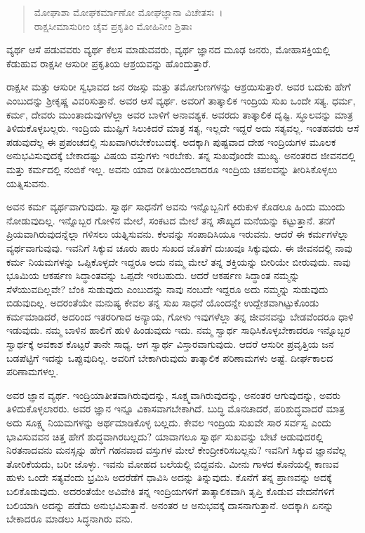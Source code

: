 \begin{verse}
ಮೋಘಾಶಾ ಮೋಘಕರ್ಮಾಣೋ ಮೋಘಜ್ಞಾನಾ ವಿಚೇತಸಃ~।\\ರಾಕ್ಷಸೀಮಾಸುರೀಂ ಚೈವ ಪ್ರಕೃತಿಂ ಮೋಹಿನೀಂ ಶ್ರಿತಾಃ 
\end{verse}

{\small ವ್ಯರ್ಥ ಆಸೆ ಪಡುವವರು ವ್ಯರ್ಥ ಕೆಲಸ ಮಾಡುವವರು, ವ್ಯರ್ಥ ಜ್ಞಾನದ ಮೂಢ ಜನರು, ಮೋಹಾಸಕ್ತಿಯಲ್ಲಿ ಕೆಡುಹುವ ರಾಕ್ಷಸೀ ಆಸುರೀ ಪ್ರಕೃತಿಯ ಆಶ್ರಯವನ್ನು ಹೊಂದುತ್ತಾರೆ.}

ರಾಕ್ಷಸೀ ಮತ್ತು ಆಸುರೀ ಸ್ವಭಾವದ ಜನ ರಜಸ್ಸು ಮತ್ತು ತಮೋಗುಣಗಳನ್ನು ಆಶ್ರಯಿಸುತ್ತಾರೆ. ಅವರ ಬದುಕು ಹೇಗೆ ಎಂಬುದನ್ನು ಶ‍್ರೀಕೃಷ್ಣ ವಿವರಿಸುತ್ತಾನೆ. ಅವರ ಆಸೆ ವ್ಯರ್ಥ. ಅವರಿಗೆ ತಾತ್ಕಾಲಿಕ ಇಂದ್ರಿಯ ಸುಖ ಒಂದೇ ಸತ್ಯ. ಧರ್ಮ, ಕರ್ಮ, ದೇವರು ಮುಂತಾದುವುಗಳೆಲ್ಲಾ ಅವರ ಬಾಳಿಗೆ ಅನಾವಶ್ಯಕ. ಅವರದು ತಾತ್ಕಾಲಿಕ ದೃಷ್ಟಿ. ಸ್ಥೂಲವನ್ನು ಮಾತ್ರ ತಿಳಿದುಕೊಳ್ಳಬಲ್ಲರು. ಇಂದ್ರಿಯ ಮುಷ್ಟಿಗೆ ಸಿಲುಕಿದರೆ ಮಾತ್ರ ಸತ್ಯ, ಇಲ್ಲದೇ ಇದ್ದರೆ ಅದು ಸತ್ಯವಲ್ಲ. ಇಂತಹವರು ಆಸೆ ಪಡುವುದೆಲ್ಲ ಈ ಪ್ರಪಂಚದಲ್ಲಿ ಸುಖವಾಗಿರಬೇಕೆಂಬುದಕ್ಕೆ. ಅದಕ್ಕಾಗಿ ಪುಷ್ಟವಾದ ದೇಹ ಇಂದ್ರಿಯಗಳ ಮೂಲಕ ಅನುಭವಿಸುವುದಕ್ಕೆ ಬೇಕಾದಷ್ಟು ವಿಷಯ ವಸ್ತುಗಳು ಇರಬೇಕು. ತನ್ನ ಸುಖವೊಂದೇ ಮುಖ್ಯ. ಅನಂತರದ ಜೀವನದಲ್ಲಿ ಮತ್ತು ಕರ್ಮದಲ್ಲಿ ನಂಬಿಕೆ ಇಲ್ಲ. ಅವನು ಯಾವ ರೀತಿಯಿಂದಲಾದರೂ ಇಂದ್ರಿಯ ಚಪಲವನ್ನು ತೀರಿಸಿಕೊಳ್ಳಲು ಯತ್ನಿಸುವನು.

ಅವನ ಕರ್ಮ ವ್ಯರ್ಥವಾಗುವುದು. ಸ್ವಾರ್ಥ ಸಾಧನೆಗೆ ಅವನು ಇನ್ನೊಬ್ಬನಿಗೆ ಕಿರುಕುಳ ಕೊಡಲೂ ಹಿಂದು ಮುಂದು ನೋಡುವುದಿಲ್ಲ. ಇನ್ನೊಬ್ಬರ ಗೋಳಿನ ಮೇಲೆ, ಸಂಕಟದ ಮೇಲೆ ತನ್ನ ಸೌಖ್ಯದ ಮನೆಯನ್ನು ಕಟ್ಟುತ್ತಾನೆ. ತನಗೆ ಪ್ರಿಯವಾಗಿರುವುದನ್ನೆಲ್ಲಾ ಗಳಿಸಲು ಯತ್ನಿಸುವನು. ಕೆಲವನ್ನು ಸಂಪಾದಿಸಿಯೂ ಇರುವನು. ಆದರೆ ಈ ಕರ್ಮಗಳೆಲ್ಲಾ ವ್ಯರ್ಥವಾಗುವುವು. ಇವನಿಗೆ ಸಿಕ್ಕುವ ಚೂರು ಪಾರು ಸುಖದ ಜೊತೆಗೆ ದುಃಖವೂ ಸಿಕ್ಕುವುದು. ಈ ಜೀವನದಲ್ಲಿ ನಾವು ಕರ್ಮ ನಿಯಮಗಳನ್ನು ಒಪ್ಪಿಕೊಳ್ಳದೇ ಇದ್ದರೂ ಅದು ನಮ್ಮ ಮೇಲೆ ತನ್ನ ಶಕ್ತಿಯನ್ನು ಬೀರಿಯೇ ಬೀರುವುದು. ನಾವು ಭೂಮಿಯ ಆಕರ್ಷಣ ಸಿದ್ಧಾಂತವನ್ನು ಒಪ್ಪದೇ ಇರಬಹುದು. ಆದರೆ ಆಕರ್ಷಣ ಸಿದ್ಧಾಂತ ನಮ್ಮನ್ನು ಸೆಳೆಯುವದಿಲ್ಲವೇ? ಬೆಂಕಿ ಸುಡುವುದು ಎಂಬುದನ್ನು ನಾವು ನಂಬದೇ ಇದ್ದರೂ ಅದು ನಮ್ಮನ್ನು ಸುಡುವುದು ಬಿಡುವುದಿಲ್ಲ. ಅದರಂತೆಯೇ ಮನುಷ್ಯ ಕೇವಲ ತನ್ನ ಸುಖ ಸಾಧನೆ ಯೊಂದನ್ನೇ ಉದ್ದೇಶವಾಗಿಟ್ಟುಕೊಂಡು ಕರ್ಮಮಾಡಿದರೆ, ಅದರಿಂದ ಇತರರಿಗಾದ ಅನ್ಯಾಯ, ಗೋಳು ಇವುಗಳೆಲ್ಲಾ ತನ್ನ ಜೀವನವನ್ನು ಬೇಡವೆಂದರೂ ಧಾಳಿ ಇಡುವುದು. ನಮ್ಮ ಬಾಳಿನ ಹಾಲಿಗೆ ಹುಳಿ ಹಿಂಡುವುದು ಇದು. ನಮ್ಮ ಸ್ವಾರ್ಥ ಸಾಧಿಸಿಕೊಳ್ಳಬೇಕಾದರೂ ಇನ್ನೊಬ್ಬರ ಸ್ವಾರ್ಥಕ್ಕೆ ಅವಕಾಶ ಕೊಟ್ಟರೆ ತಾನೇ ಸಾಧ್ಯ. ಆಗ ಸ್ವಾರ್ಥ ವಿಸ್ತಾರವಾಗುವುದು. ಆದರೆ ಆಸುರೀ ಪ್ರವೃತ್ತಿಯ ಜನ ಬಡಪೆಟ್ಟಿಗೆ ಇದನ್ನು ಒಪ್ಪುವುದಿಲ್ಲ. ಅವರಿಗೆ ಬೇಕಾಗಿರುವುದು ತಾತ್ಕಾಲಿಕ ಪರಿಣಾಮಗಳು ಅಷ್ಟೆ. ದೀರ್ಘಕಾಲದ ಪರಿಣಾಮಗಳಲ್ಲ.

ಅವರ ಜ್ಞಾನ ವ್ಯರ್ಥ. ಇಂದ್ರಿಯಾತೀತವಾಗಿರುವುದನ್ನು, ಸೂಕ್ಷ್ಮವಾಗಿರುವುದನ್ನು, ಅನಂತರ ಆಗುವುದನ್ನು, ಅವರು ತಿಳಿದುಕೊಳ್ಳಲಾರರು. ಅವರ ಜ್ಞಾನ ಇನ್ನೂ ವಿಕಾಸವಾಗಬೇಕಾಗಿದೆ. ಬುದ್ಧಿ ಮೊನಚಾದರೆ, ಪರಿಶುದ್ಧವಾದರೆ ಮಾತ್ರ ಅದು ಸೂಕ್ಷ್ಮ ನಿಯಮಗಳನ್ನು ಅರ್ಥಮಾಡಿಕೊಳ್ಳ ಬಲ್ಲದು. ಕೇವಲ ಇಂದ್ರಿಯ ಸುಖವೇ ಸಾರ ಸರ್ವಸ್ವ ಎಂದು ಭಾವಿಸುವವನ ಚಿತ್ತ ಹೇಗೆ ಶುದ್ಧವಾಗಿರಬಲ್ಲದು? ಯಾವಾಗಲೂ ಸ್ವಾರ್ಥ ಸುಖವನ್ನು ಬೇಟೆ ಆಡುವುದರಲ್ಲಿ ನಿರತನಾದವನು ಮನಸ್ಸನ್ನು ಹೇಗೆ ಗಹನವಾದ ವಸ್ತುಗಳ ಮೇಲೆ ಕೇಂದ್ರೀಕರಿಸಬಲ್ಲನು? ಇವನಿಗೆ ಸಿಕ್ಕುವ ಜ್ಞಾನವೆಲ್ಲ ತೋರಿಕೆಯದು, ಬರೀ ಜೊಳ್ಳು. ಇವನು ಮೋಹದ ಬಲೆಯಲ್ಲಿ ಬಿದ್ದವನು. ಮೀನು ಗಾಳದ ಕೊನೆಯಲ್ಲಿ ಕಾಣುವ ಹುಳು ಒಂದೇ ಸತ್ಯವೆಂದು ಭ್ರಮಿಸಿ ಅದರೆಡೆಗೆ ಧಾವಿಸಿ ಅದನ್ನು ತಿನ್ನುವುದು. ಕೊನೆಗೆ ತನ್ನ ಪ್ರಾಣವನ್ನು ಅದಕ್ಕೆ ಬಲಿಕೊಡುವುದು. ಅದರಂತೆಯೇ ಅವಿವೇಕಿ ತನ್ನ ಇಂದ್ರಿಯಗಳಿಗೆ ತಾತ್ಕಾಲಿಕವಾಗಿ ತೃಪ್ತಿ ಕೊಡುವ ವೇದನೆಗಳಿಗೆ ಬಲಿಯಾಗಿ ಅದನ್ನು ಪಡೆದು ಅನುಭವಿಸುತ್ತಾನೆ. ಅನಂತರ ಆ ಅನುಭವಕ್ಕೆ ದಾಸನಾಗುತ್ತಾನೆ. ಅದಕ್ಕಾಗಿ ಏನನ್ನು ಬೇಕಾದರೂ ಮಾಡಲು ಸಿದ್ಧನಾಗಿರು ವನು.

